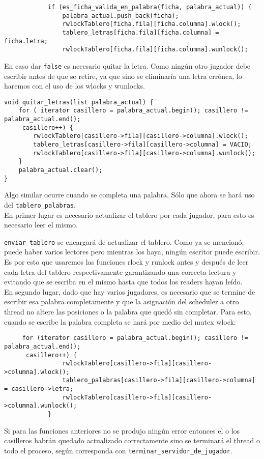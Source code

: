 \begin{verbatim}
            if (es_ficha_valida_en_palabra(ficha, palabra_actual)) {
                palabra_actual.push_back(ficha);
                rwlockTablero[ficha.fila][ficha.columna].wlock();
                tablero_letras[ficha.fila][ficha.columna] = ficha.letra;
                rwlockTablero[ficha.fila][ficha.columna].wunlock(); 
\end{verbatim}

En caso dar \texttt{false} es necesario quitar la letra. Como ningún otro jugador debe escribir antes de que se retire, ya que sino se eliminaría una letra errónea, lo haremos con el uso de los wlocks y wunlocks.

\begin{verbatim}
void quitar_letras(list palabra_actual) {
    for ( iterator casillero = palabra_actual.begin(); casillero != palabra_actual.end();
     casillero++) {
        rwlockTablero[casillero->fila][casillero->columna].wlock();
        tablero_letras[casillero->fila][casillero->columna] = VACIO;
        rwlockTablero[casillero->fila][casillero->columna].wunlock();
    }
    palabra_actual.clear();
}
\end{verbatim}

Algo similar ocurre cuando se completa una palabra. S\'olo que ahora se har\'a uso del \texttt{tablero_palabras}.\\

En primer lugar es necesario actualizar el tablero por cada jugador, para esto es necesario leer el mismo.

\texttt{enviar\_tablero} se encargar\'a de actualizar el tablero. Como ya se mencion\'o, puede haber varios lectores pero mientras los haya, ningún escritor puede escribir. Es por esto que usaremos las funciones rlock y runlock antes y después de leer cada letra del tablero respectivamente garantizando una correcta lectura y evitando que se escriba en el mismo hasta que todos los readers hayan leído.\\

En segundo lugar, dado que hay varios jugadores, es necesario que se termine de escribir esa palabra completamente y que la asignación del scheduler a otro thread no altere las posiciones o la palabra que qued\'o sin completar. Para esto, cuando se escribe la palabra completa se hará por medio del mutex wlock:

\begin{verbatim}
     for (iterator casillero = palabra_actual.begin(); casillero != palabra_actual.end();
      casillero++) {
                rwlockTablero[casillero->fila][casillero->columna].wlock();
                tablero_palabras[casillero->fila][casillero->columna] = casillero->letra;
                rwlockTablero[casillero->fila][casillero->columna].wunlock();
            }
\end{verbatim}

Si para las funciones anteriores no se produjo ningún error entonces el o los casilleros habrán quedado actualizado correctamente sino se terminar\'a el thread o todo el proceso, según corresponda con \texttt{terminar\_servidor\_de\_jugador}.
